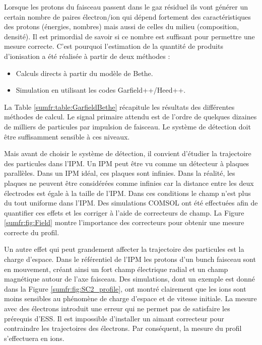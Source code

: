 Lorsque les protons du faisceau passent dans le gaz résiduel ils vont générer un certain nombre de paires électron/ion qui dépend fortement des caractéristiques des protons (énergies, nombres) mais aussi de celles du milieu (composition, densité). Il est primordial de savoir si ce nombre est suffisant pour permettre une mesure correcte. C'est pourquoi l'estimation de la quantité de produits d'ionisation a été réalisée à partir de deux méthodes :
\begin{itemize}
  \item Calculs directs à partir du modèle de Bethe.
  \item Simulation en utilisant les codes Garfield++/Heed++.
\end{itemize}
La Table \ref{sumfr:table:GarfieldBethe} récapitule les résultats des différentes méthodes de calcul. Le signal primaire attendu est de l'ordre de quelques dizaines de milliers de particules par impulsion de faisceau. Le système de détection doit être suffisamment sensible à ces niveaux.


Mais avant de choisir le système de détection, il convient d'étudier la trajectoire des particules dans l'IPM.
Un IPM peut être vu comme un détecteur à plaques parallèles. Dans un IPM idéal, ces plaques sont infinies. Dans la réalité, les plaques ne peuvent être considérées comme infinies car la distance entre les deux électrodes est égale à la taille de l'IPM. Dans ces conditions le champ n’est plus du tout uniforme dans l'IPM. Des simulations COMSOL ont été effectuées afin de quantifier ces effets et les corriger à l'aide de correcteurs de champ. La Figure \ref{sumfr:fig:Field} montre l'importance des correcteurs pour obtenir une mesure correcte du profil.



Un autre effet qui peut grandement affecter la trajectoire des particules est la charge d'espace. Dans le référentiel de l'IPM les protons d'un bunch faisceau sont en mouvement, créant ainsi un fort champ électrique radial et un champ magnétique autour de l'axe faisceau. Des simulations, dont un exemple est donné dans la Figure \ref{sumfr:fig:SC2_profile}, ont montré clairement que les ions sont moins sensibles au phénomène de charge d’espace et de vitesse initiale. 
La mesure avec des électrons introduit une erreur qui ne permet pas de satisfaire les prérequis d’ESS. Il est impossible d’installer un aimant correcteur pour contraindre les trajectoires des électrons. Par conséquent, la mesure du profil s’effectuera en ions.

